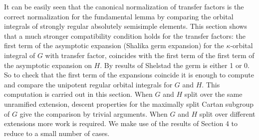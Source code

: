 \documentclass[11pt]{amsart}
\theoremstyle{plain}
\theoremstyle{definition}
\def\SHELSTAD{24}
\begin{document}
It can be easily seen that the canonical normalization of transfer factors is the
correct normalization for the fundamental lemma by comparing the orbital integrals
of strongly regular absolutely semisimple elements.   This section shows that
a much stronger compatibility condition holds for the transfer factors: the first
term of the asymptotic expansion (Shalika germ expansion) for the $\kappa$-orbital integral
of $G$ with transfer factor, coincides with the first term of the first term of the
asymptotic expansion on $H$.  By results of Shelstad \cite{\SHELSTAD} the germ is
either 1 or 0.  So to check that the first term of the expansions coincide it is
enough to compute and compare the unipotent regular orbital integrals for $G$ and $H$.
This computation is carried out in this section.   When $G$ and $H$ split over the
same unramified extension, descent properties for the maximally split Cartan subgroup of $G$
give the comparison by trivial arguments.  
When $G$ and $H$ split over different extensions more work
is required.  We make use of the results of Section 4 to reduce to a small number
of cases.
\end{document}
